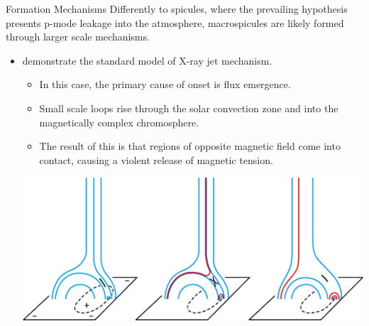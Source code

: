 \documentclass{beamer}
\begin{document}
	\begin{frame}{Formation Mechanisms}
		Differently to spicules, where the prevailing hypothesis presents p-mode leakage into the atmosphere, macrospicules are likely formed through larger scale mechanisms.
		\begin{itemize}
			\item{\cite{Shibata1992} demonstrate the standard model of X-ray jet mechanism.}
			\begin{itemize}
				\item{In this case, the primary cause of onset is flux emergence.}
				\item{Small scale loops rise through the solar convection zone and into the magnetically complex chromosphere.}
				\item{The result of this is that regions of opposite magnetic field come into contact, causing a violent release of magnetic tension.}
			\end{itemize}
			\includegraphics[scale=0.2]{"Figs/inverted_Y.jpg"}
			\caption{\cite{Moore2010}}
		\end{itemize}
	\end{frame}
\end{document}
